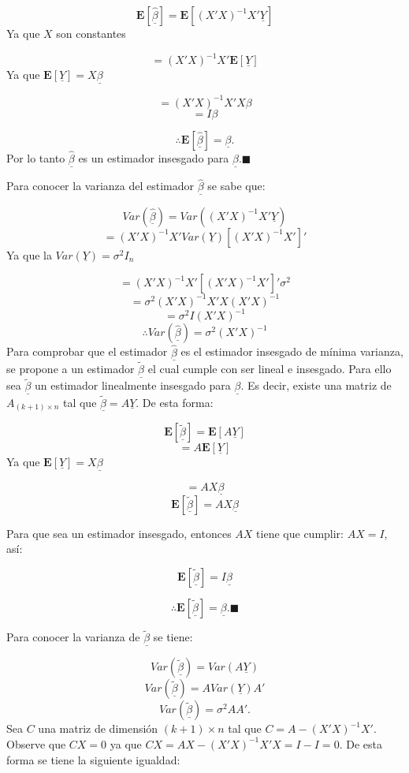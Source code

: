 \documentclass[
  a4paper,
  oneside,
  openany]{book}
\begin{document}
\[\mathbf{E}[\underline{\hat{\beta}}]=\mathbf{E}[(X'X)^{-1}X'\underline{Y}]\]
Ya que \(X\) son constantes

\[=(X'X)^{-1}X'\mathbf{E}[\underline{Y}]\]
Ya que \(\mathbf{E}[\underline{Y}]=X\underline{\beta}\)

\[=(X'X)^{-1}X'X\beta\]
\[=I\beta\]

\[\therefore \mathbf{E}[\underline{\hat{\beta}}]=\underline{\beta}.\]
Por lo tanto \(\underline{\hat{\beta}}\) es un estimador insesgado para \(\underline{\beta}\).\(\blacksquare\)

Para conocer la varianza del estimador \(\underline{\hat{\beta}}\) se sabe que:

\[Var(\underline{\hat{\beta}})=Var\left( (X'X)^{-1}X'\underline{Y}\right)\]
\[=(X'X)^{-1}X'Var(\underline{Y})[(X'X)^{-1}X']'\]
Ya que la \(Var(\underline{Y})=\sigma^2I_{n}\)

\[=(X'X)^{-1}X'[(X'X)^{-1}X']'\sigma^2\]
\[=\sigma^2(X'X)^{-1}X'X(X'X)^{-1}\]
\[
=\sigma^2I(X'X)^{-1}
\]
\[
\therefore Var(\underline{\hat{\beta}})=\sigma^2(X'X)^{-1}
\]
Para comprobar que el estimador \(\underline{\hat{\beta}}\) es el estimador insesgado de mínima varianza, se propone a un estimador \(\underline{\tilde{\beta}}\) el cual cumple con ser lineal e insesgado. Para ello sea \(\underline{\tilde{\beta}}\) un estimador linealmente insesgado para \(\underline{\beta}\). Es decir, existe una matriz de \(A_{(k+1)\times n}\) tal que \(\underline{\tilde{\beta}}=A \underline{Y}.\)
De esta forma:

\[
\mathbf{E}\left[\underline{\tilde{\beta}}\right]=\mathbf{E}\left[ A\underline{Y} \right]
\]
\[
=A \mathbf{E}[\underline{Y}]
\]
Ya que \(\mathbf{E}[\underline{Y}]=X\underline{\beta}\)

\[
=AX\underline{\beta}
\]
\[
\mathbf{E}\left[\underline{\tilde{\beta}}\right]=AX\underline{\beta}
\]

Para que sea un estimador insesgado, entonces \(AX\) tiene que cumplir: \(AX=I\), así:

\[
\mathbf{E}\left[\underline{\tilde{\beta}}\right]=I\underline{\beta}
\]

\[
\therefore \mathbf{E}\left[\underline{\tilde{\beta}}\right]=\underline{\beta}.\blacksquare
\]

Para conocer la varianza de \(\underline{\tilde{\beta}}\) se tiene:

\[
Var\left(\underline{\tilde{\beta}}\right)= Var(A\underline{Y})
\]
\[
Var\left(\underline{\tilde{\beta}}\right)=A Var(\underline{Y})A'
\]
\[
Var\left(\underline{\tilde{\beta}}\right)=\sigma^2 AA'.
\]
Sea \(C\) una matriz de dimensión \((k+1) \times n\) tal que \(C=A-(X'X)^{-1}X'\). Observe que \(CX=0\) ya que \(CX=AX-(X'X)^{-1}X'X=I-I=0.\)
De esta forma se tiene la siguiente igualdad:
\end{document}
